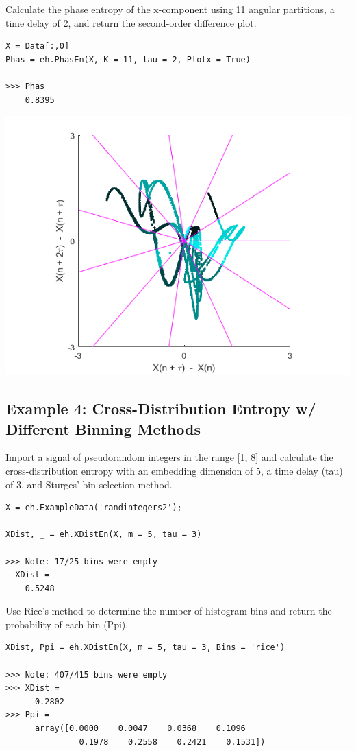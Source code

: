 \documentclass[12pt, a4paper, titlepage, openany]{book}
\begin{document}
Calculate the phase  entropy of the x-component using 11 angular partitions, a time delay of 2, and return the second-order difference plot.
\begin{verbatim}
X = Data[:,0]
Phas = eh.PhasEn(X, K = 11, tau = 2, Plotx = True)

>>> Phas
	0.8395
\end{verbatim}
\includegraphics[scale=.6]{phasex2.png}


\newpage
\subsection{\normalsize Example 4: \hspace{15mm} Cross-Distribution Entropy w/ Different Binning Methods}
\noindent Import a signal of pseudorandom integers in the range [1, 8] and calculate the cross-distribution entropy with an embedding dimension of 5, a time delay (tau) of 3, and Sturges' bin selection method.
\begin{verbatim}
X = eh.ExampleData('randintegers2');

XDist, _ = eh.XDistEn(X, m = 5, tau = 3)

>>> Note: 17/25 bins were empty
  XDist = 
    0.5248
\end{verbatim}
Use Rice's method to determine the number of histogram bins and return the probability of each bin (Ppi).
\begin{verbatim}
XDist, Ppi = eh.XDistEn(X, m = 5, tau = 3, Bins = 'rice')

>>> Note: 407/415 bins were empty
>>> XDist =
      0.2802
>>> Ppi =
      array([0.0000    0.0047    0.0368    0.1096  
    	       0.1978    0.2558    0.2421    0.1531])
\end{verbatim}
\end{document}
